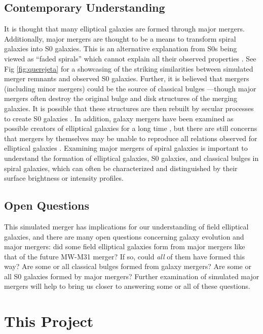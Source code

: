 \documentclass[twocolumn]{aastex631}
\begin{document}
\subsection{Contemporary Understanding}
It is thought that many elliptical galaxies are formed through major mergers. Additionally, major mergers are thought to be a means to transform spiral galaxies into S0 galaxies. This is an alternative explanation from S0s being viewed as ``faded spirals'' which cannot explain all their observed properties \citep{querejeta2015II}. See Fig \ref{fig:querejeta} for a showcasing of the striking similarities between simulated merger remnants and observed S0 galaxies. Further, it is believed that mergers (including minor mergers) could be the source of classical bulges \citep{brooks2016}---though major mergers often destroy the original bulge and disk structures of the merging galaxies. It is possible that these structures are then rebuilt by secular processes to create S0 galaxies \citep{querejeta2015I}. In addition, galaxy mergers have been examined as possible creators of elliptical galaxies for a long time \citep{toomre1977}, but there are still concerns that mergers by themselves may be unable to reproduce all relations observed for elliptical galaxies \citep{brooks2016}. Examining major mergers of spiral galaxies is important to understand the formation of elliptical galaxies, S0 galaxies, and classical bulges in spiral galaxies, which can often be characterized and distinguished by their surface brightness or intensity profiles.

\subsection{Open Questions}
This simulated merger has implications for our understanding of field elliptical galaxies, and there are many open questions concerning galaxy evolution and major mergers: did some field elliptical galaxies form from major mergers like that of the future MW-M31 merger? If so, could \emph{all} of them have formed this way? Are some or all classical bulges formed from galaxy mergers? Are some or all S0 galaxies formed by major mergers? Further examination of simulated major mergers will help to bring us closer to answering some or all of these questions.


\section{This Project}
\end{document}
